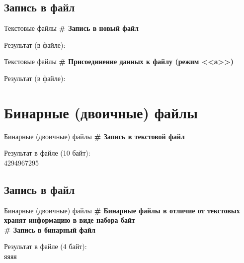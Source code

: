 \documentclass[12pt]{beamer}
\begin{document}
\subsection{Запись в файл}
\begin{frame}{Текстовые файлы}
\textbf{\# Запись в новый файл} \\
\vspace{0.5cm}

\vspace{0.5cm}
Результат (в файле): \\

\end{frame}

\begin{frame}{Текстовые файлы}
\textbf{\# Присоединение данных к файлу (режим <<a>>)} \\
\vspace{0.3cm}

\vspace{0.5cm}
Результат (в файле): \\

\end{frame}

\section{Бинарные (двоичные) файлы}
\begin{frame}{Бинарные (двоичные) файлы}
\textbf{\# Запись в текстовой файл} \\
\vspace{0.5cm}

\vspace{0.5cm}
Результат в файле (10 байт): \\
4294967295 \\
\end{frame}


\subsection{Запись в файл}
\begin{frame}{Бинарные (двоичные) файлы}
\textbf{\# Бинарные файлы в отличие от текстовых хранят информацию в виде набора байт} \\
\vspace{0.3cm}
\textbf{\# Запись в бинарный файл} \\
\vspace{0.5cm}

\vspace{0.5cm}
Результат в файле (4 байт): \\
яяяя \\
\end{frame}
\end{document}
